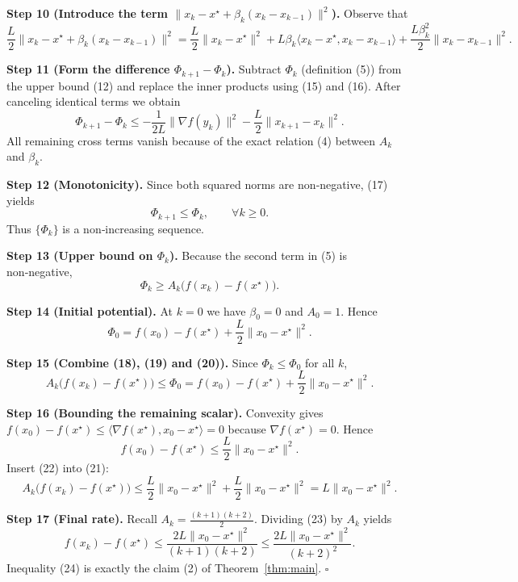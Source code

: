 \documentclass{article}
\newcommand{\grad}{\nabla}
\begin{document}
\medskip
\noindent\textbf{Step 10 (Introduce the term \(\|x_k-x^\star+\beta_k(x_k-x_{k-1})\|^2\)).}  
Observe that
\[
\frac{L}{2}\|x_k-x^\star+\beta_k(x_k-x_{k-1})\|^2
 = \frac{L}{2}\|x_k-x^\star\|^2
   + L\beta_k\langle x_k-x^\star, x_k-x_{k-1}\rangle
   + \frac{L\beta_k^2}{2}\|x_k-x_{k-1}\|^2 .
\tag{16}
\]

\medskip
\noindent\textbf{Step 11 (Form the difference \(\Phi_{k+1}-\Phi_k\)).}  
Subtract \(\Phi_k\) (definition (5)) from the upper bound (12) and replace the inner products using (15) and (16). After canceling identical terms we obtain
\[
\Phi_{k+1}-\Phi_k
\le -\frac{1}{2L}\|\grad f(y_k)\|^2
   -\frac{L}{2}\|x_{k+1}-x_k\|^2 .
\tag{17}
\]
All remaining cross terms vanish because of the exact relation (4) between \(A_k\) and \(\beta_k\).  

\medskip
\noindent\textbf{Step 12 (Monotonicity).}  
Since both squared norms are non‑negative, (17) yields
\[
\Phi_{k+1}\le \Phi_k,\qquad\forall k\ge 0 .
\tag{18}
\]
Thus \(\{\Phi_k\}\) is a non‑increasing sequence.

\medskip
\noindent\textbf{Step 13 (Upper bound on \(\Phi_k\)).}  
Because the second term in (5) is non‑negative,
\[
\Phi_k \ge A_k\bigl(f(x_k)-f(x^\star)\bigr) .
\tag{19}
\]

\medskip
\noindent\textbf{Step 14 (Initial potential).}  
At \(k=0\) we have \(\beta_0=0\) and \(A_0=1\). Hence
\[
\Phi_0 = f(x_0)-f(x^\star)+\frac{L}{2}\|x_0-x^\star\|^2 .
\tag{20}
\]

\medskip
\noindent\textbf{Step 15 (Combine (18), (19) and (20)).}  
Since \(\Phi_k\le\Phi_0\) for all \(k\),
\[
A_k\bigl(f(x_k)-f(x^\star)\bigr) \le \Phi_0
   = f(x_0)-f(x^\star)+\frac{L}{2}\|x_0-x^\star\|^2 .
\tag{21}
\]

\medskip
\noindent\textbf{Step 16 (Bounding the remaining scalar).}  
Convexity gives \(f(x_0)-f(x^\star)\le \langle \grad f(x^\star),x_0-x^\star\rangle =0\) because \(\grad f(x^\star)=0\). Hence
\[
f(x_0)-f(x^\star)\le \frac{L}{2}\|x_0-x^\star\|^2 .
\tag{22}
\]
Insert (22) into (21):
\[
A_k\bigl(f(x_k)-f(x^\star)\bigr)
   \le \frac{L}{2}\|x_0-x^\star\|^2 + \frac{L}{2}\|x_0-x^\star\|^2
   = L\|x_0-x^\star\|^2 .
\tag{23}
\]

\medskip
\noindent\textbf{Step 17 (Final rate).}  
Recall \(A_k=\frac{(k+1)(k+2)}{2}\). Dividing (23) by \(A_k\) yields
\[
f(x_k)-f(x^\star)
   \le \frac{2L\|x_0-x^\star\|^2}{(k+1)(k+2)}
   \le \frac{2L\|x_0-x^\star\|^2}{(k+2)^2}.
\tag{24}
\]
Inequality (24) is exactly the claim (2) of Theorem~\ref{thm:main}. \(\square\)
\end{document}
